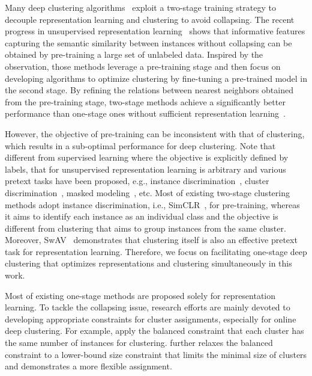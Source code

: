 \documentclass[10pt,twocolumn,letterpaper]{article}
\begin{document}
Many deep clustering algorithms~\cite{DangD0WH21,GansbekeVGPG20,ZhongW0HDNL021} exploit a two-stage training strategy to decouple representation learning and clustering to avoid collapsing. The recent progress in unsupervised representation learning~\cite{abs-2106-08254,CaronBJD18,ChenK0H20,abs-2111-06377,He0WXG20,coke} shows that informative features capturing the semantic similarity between instances without collapsing can be obtained by pre-training a large set of unlabeled data. Inspired by the observation, those methods leverage a pre-training stage and then focus on developing algorithms to optimize clustering by fine-tuning a pre-trained model in the second stage. By refining the relations between nearest neighbors obtained from the pre-training stage, two-stage methods achieve a significantly better performance than one-stage ones without sufficient representation learning~\cite{HuangGZ20,JiVH19}.

However, the objective of pre-training can be inconsistent with that of clustering, which results in a sub-optimal performance for deep clustering. Note that different from supervised learning where the objective is explicitly defined by labels, that for unsupervised representation learning is arbitrary and various pretext tasks have been proposed, e.g., instance discrimination~\cite{ChenK0H20,He0WXG20}, cluster discrimination~\cite{CaronBJD18,coke}, masked modeling~\cite{abs-2106-08254,abs-2111-06377}, etc. Most of existing two-stage clustering methods adopt instance discrimination, i.e., SimCLR~\cite{ChenK0H20}, for pre-training, whereas it aims to identify each instance as an individual class and the objective is different from clustering that aims to group instances from the same cluster. Moreover, SwAV~\cite{CaronMMGBJ20} demonstrates that clustering itself is also an effective pretext task for representation learning. Therefore, we focus on facilitating one-stage deep clustering that optimizes representations and clustering simultaneously in this work.

Most of existing one-stage methods are proposed solely for representation learning. To tackle the collapsing issue, research efforts are mainly devoted to developing appropriate constraints for cluster assignments, especially for online deep clustering. For example, \cite{AsanoRV20a,CaronMMGBJ20} apply the balanced constraint that each cluster has the same number of instances for clustering. \cite{coke} further relaxes the balanced constraint to a lower-bound size constraint that limits the minimal size of clusters and demonstrates a more flexible assignment. 
\end{document}
